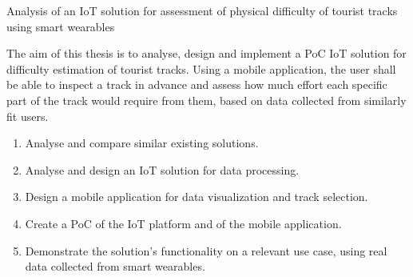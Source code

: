 \linebreak
Analysis of an IoT solution for assessment of physical difficulty of tourist tracks using smart wearables

The aim of this thesis is to analyse, design and implement a PoC IoT solution for difficulty estimation of tourist tracks.
Using a mobile application, the user shall be able to inspect a track in advance and assess how much effort each specific part of the track would require from them, based on data collected from similarly fit users.
\begin{enumerate}
    \item Analyse and compare similar existing solutions.
    \item Analyse and design an IoT solution for data processing.
    \item Design a mobile application for data visualization and track selection.
    \item Create a PoC of the IoT platform and of the mobile application.
    \item Demonstrate the solution's functionality on a relevant use case, using real data collected from smart wearables.
\end{enumerate}
